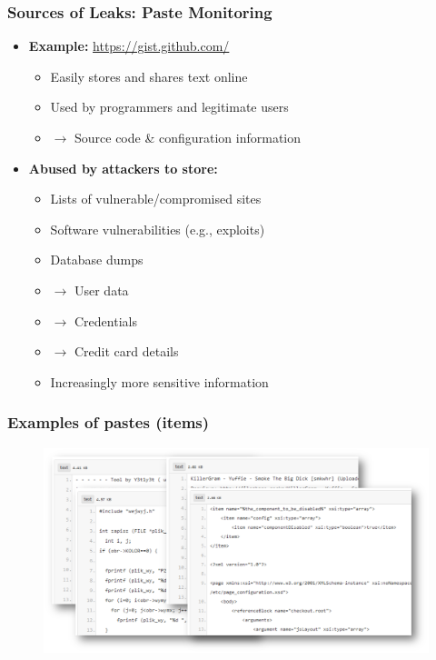 \documentclass[aspectratio=169]{beamer}
\begin{document}
\begin{frame}
    \frametitle{Sources of Leaks: Paste Monitoring}
    \begin{itemize}
        \item \textbf{Example:} \url{https://gist.github.com/}
        \begin{itemize}
            \item Easily stores and shares text online
            \item Used by programmers and legitimate users
            \item[] $\rightarrow$ Source code \& configuration information
        \end{itemize}
        \vspace{0.3cm}
        \item \textbf{Abused by attackers to store:}
        \begin{itemize}
            \item Lists of vulnerable/compromised sites
            \item Software vulnerabilities (e.g., exploits)
            \item Database dumps
            \item[] $\rightarrow$ User data
            \item[] $\rightarrow$ Credentials
            \item[] $\rightarrow$ Credit card details
            \item Increasingly more sensitive information
        \end{itemize}
    \end{itemize}
\end{frame}

\begin{frame}[t,plain]
        \frametitle{Examples of pastes (items)}
    \begin{figure}
        \includegraphics[scale=0.32, angle=0]{images/pastes-ex.png}
    \end{figure}
\end{frame}
\end{document}
